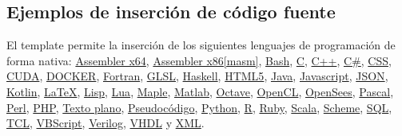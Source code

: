 		\lipsum[4]

		\begin{multicols}{2}

			\lipsum[4]


			\lipsum[1]

		\end{multicols}

	\subsection{Ejemplos de inserción de código fuente}

		\newcommand{\insertsrcmanual}[2]{\href{https://latex.ppizarror.com/informe.html?srctype=#1\#hlp-srccode}{#2}}

		El template permite la inserción de los siguientes lenguajes de programación de forma nativa: \insertsrcmanual{assemblerx64}{Assembler x64}, \insertsrcmanual{assemblerx86}{Assembler x86[masm]},  \insertsrcmanual{bash}{Bash}, \insertsrcmanual{c}{C}, \insertsrcmanual{cpp}{C++}, \insertsrcmanual{csharp}{C\#}, \insertsrcmanual{css}{CSS}, \insertsrcmanual{cuda}{CUDA}, \insertsrcmanual{docker}{DOCKER}, \insertsrcmanual{fortran}{Fortran}, \insertsrcmanual{glsl}{GLSL}, \insertsrcmanual{haskell}{Haskell}, \insertsrcmanual{html5}{HTML5}, \insertsrcmanual{java}{Java}, \insertsrcmanual{js}{Javascript}, \insertsrcmanual{json}{JSON}, \insertsrcmanual{kotlin}{Kotlin}, \insertsrcmanual{latex}{LaTeX}, \insertsrcmanual{lisp}{Lisp}, \insertsrcmanual{lua}{Lua}, \insertsrcmanual{maple}{Maple}, \insertsrcmanual{matlab}{Matlab}, \insertsrcmanual{octave}{Octave}, \insertsrcmanual{opencl}{OpenCL}, \insertsrcmanual{opensees}{OpenSees}, \insertsrcmanual{pascal}{Pascal}, \insertsrcmanual{perl}{Perl}, \insertsrcmanual{php}{PHP}, \insertsrcmanual{plaintext}{Texto plano}, \insertsrcmanual{pseudocode}{Pseudocódigo}, \insertsrcmanual{python}{Python}, \insertsrcmanual{r}{R}, \insertsrcmanual{ruby}{Ruby}, \insertsrcmanual{scala}{Scala}, \insertsrcmanual{scheme}{Scheme}, \insertsrcmanual{sql}{SQL}, \insertsrcmanual{tcl}{TCL}, \insertsrcmanual{vbscript}{VBScript}, \insertsrcmanual{verilog}{Verilog}, \insertsrcmanual{vhdl}{VHDL} y \insertsrcmanual{xml}{XML}. \\
		
